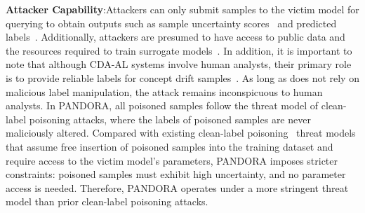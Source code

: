 \textbf{Attacker Capability}:Attackers can only submit samples to the victim model for querying to obtain outputs such as sample uncertainty scores~\cite{2025-Baidu-Image-Recognition} and predicted labels~\cite{Virustotaluploadinterface}.
Additionally, attackers are presumed to have access to public data and the resources required to train surrogate models~\cite{2023-AAAI-surrogate-model-for-adversarial-attack}.
In addition, it is important to note that although CDA-AL systems involve human analysts, their primary role is to provide reliable labels for concept drift samples~\cite{2023-Usenix-chenyizhen}.
As long as \pandora does not rely on malicious label manipulation, the attack remains inconspicuous to human analysts.
In PANDORA, all poisoned samples follow the threat model of clean-label poisoning attacks, where the labels of poisoned samples are never maliciously altered.
Compared with existing clean-label poisoning~\cite{2018-NIPS-Poison-frogs} threat models that assume free insertion of poisoned samples into the training dataset and require access to the victim model’s parameters, PANDORA imposes stricter constraints: poisoned samples must exhibit high uncertainty, and no parameter access is needed.
Therefore, PANDORA operates under a more stringent threat model than prior clean-label poisoning attacks.